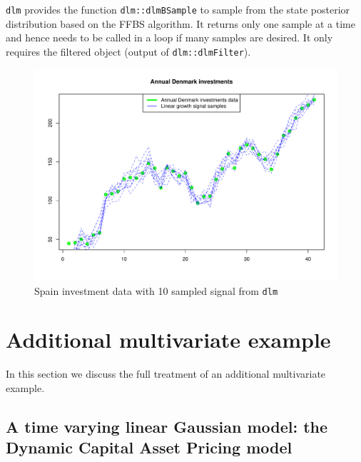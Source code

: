 \documentclass{article}
\begin{document}
\texttt{dlm} provides the function \texttt{dlm::dlmBSample} to sample from the state
posterior distribution based on the FFBS algorithm. It returns only one sample at a time and
hence needs to be called in a loop if many samples are desired. It only requires the filtered
object (output of \texttt{dlm::dlmFilter}).
\begin{figure}[H]
  \centering
\includegraphics{vignette-028}
\caption{Spain investment data with 10 sampled signal from \texttt{dlm}}
\label{fig:LGSampledlm}
\end{figure}

\section{Additional multivariate example}
\label{sec:additional example}

In this section we discuss the full treatment of an additional multivariate example.

\subsection{A time varying linear Gaussian model: the Dynamic Capital Asset Pricing model}
\end{document}
